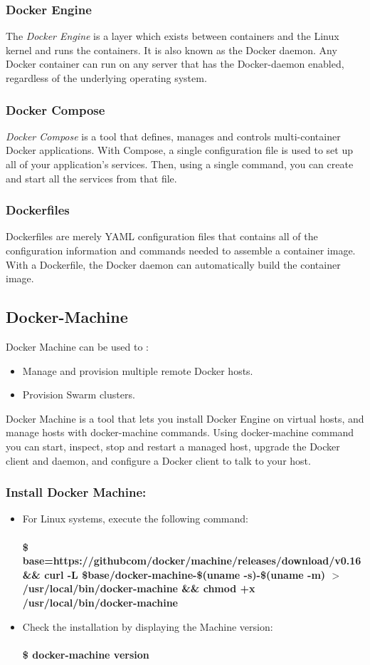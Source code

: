 \documentclass[12pt]{article}
\begin{document}
\subsubsection{Docker Engine}
The \textit{Docker Engine} is a layer which exists between containers and the Linux kernel and runs the containers. It is also known as the Docker daemon. Any Docker container can run on any server that has the Docker-daemon enabled, regardless of the underlying operating system.
\subsubsection{Docker Compose}
\textit{Docker Compose} is a tool that defines, manages and controls multi-container Docker applications. With Compose, a single configuration file is used to set up all of your application’s services. Then, using a single command, you can create and start all the services from that file.
\subsubsection{Dockerfiles}
Dockerfiles are merely YAML configuration files that contains all of the configuration information and commands needed to assemble a container image. With a Dockerfile, the Docker daemon can automatically build the container image.
\subsection{Docker-Machine}
Docker Machine can be used to :
\begin{itemize}
	\item Manage and provision multiple remote Docker hosts.
	\item Provision Swarm clusters.
\end{itemize}
Docker Machine is a tool that lets you install Docker Engine on virtual hosts, and manage hosts with docker-machine commands. Using docker-machine command you can start, inspect, stop and restart a managed host, upgrade the Docker client and daemon, and configure a Docker client to talk to your host.
\subsubsection{Install Docker Machine:}
\begin{itemize}
	\item For Linux systems, execute the following command:\\\\
	\textbf{\$ base=https://githubcom/docker/machine/releases/download/v0.16 \&\& curl -L \$base/docker-machine-\$(uname -s)-\$(uname -m) $>$/usr/local/bin/docker-machine \&\& chmod +x /usr/local/bin/docker-machine}
	\item Check the installation by displaying the Machine version:\\\\
	\textbf{\$ docker-machine version}
\end{itemize}
\end{document}
